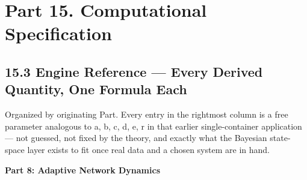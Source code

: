 \documentclass[
]{article}
\begin{document}
\hypertarget{part-15.-computational-specification}{%
\section{Part 15. Computational
Specification}\label{part-15.-computational-specification}}

\hypertarget{engine-reference-every-derived-quantity-one-formula-each}{%
\subsection{15.3 Engine Reference --- Every Derived Quantity, One
Formula
Each}\label{engine-reference-every-derived-quantity-one-formula-each}}

Organized by originating Part. Every entry in the rightmost column is a
free parameter analogous to a, b, c, d, e, r in that earlier
single-container application --- not guessed, not fixed by the theory,
and exactly what the Bayesian state-space layer exists to fit once real
data and a chosen system are in hand.

\textbf{Part 8: Adaptive Network Dynamics}
\end{document}
